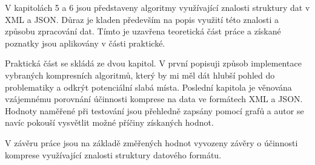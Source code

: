V kapitolách 5 a 6 jsou představeny algoritmy využívající znalosti struktury dat v XML a JSON. Důraz je kladen především na popis využití této znalosti a způsobu zpracování dat. Tímto je uzavřena teoretická část práce a získané poznatky jsou aplikovány v části praktické.

Praktická část se skládá ze dvou kapitol. V první popisuji způsob implementace vybraných kompresních algoritmů, který by mi měl dát hlubší pohled do problematiky a odkrýt potenciální slabá místa. Poslední kapitola je věnována vzájemnému porovnání účinnosti komprese na data ve formátech XML a JSON. Hodnoty naměřené při testování jsou přehledně zapsány pomocí grafů a autor se navíc pokouší vysvětlit možné příčiny získaných hodnot.

V závěru práce jsou na základě změřených hodnot vyvozeny závěry o účinnosti komprese využívající znalosti struktury datového formátu.